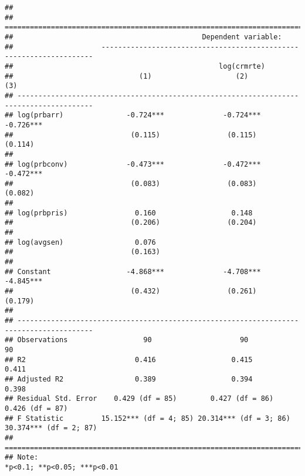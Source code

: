 \documentclass[]{article}
\begin{document}
\begin{verbatim}
## 
## ========================================================================================
##                                             Dependent variable:                         
##                     --------------------------------------------------------------------
##                                                 log(crmrte)                             
##                              (1)                    (2)                    (3)          
## ----------------------------------------------------------------------------------------
## log(prbarr)               -0.724***              -0.724***              -0.726***       
##                            (0.115)                (0.115)                (0.114)        
##                                                                                         
## log(prbconv)              -0.473***              -0.472***              -0.472***       
##                            (0.083)                (0.083)                (0.082)        
##                                                                                         
## log(prbpris)                0.160                  0.148                                
##                            (0.206)                (0.204)                               
##                                                                                         
## log(avgsen)                 0.076                                                       
##                            (0.163)                                                      
##                                                                                         
## Constant                  -4.868***              -4.708***              -4.845***       
##                            (0.432)                (0.261)                (0.179)        
##                                                                                         
## ----------------------------------------------------------------------------------------
## Observations                  90                     90                     90          
## R2                          0.416                  0.415                  0.411         
## Adjusted R2                 0.389                  0.394                  0.398         
## Residual Std. Error    0.429 (df = 85)        0.427 (df = 86)        0.426 (df = 87)    
## F Statistic         15.152*** (df = 4; 85) 20.314*** (df = 3; 86) 30.374*** (df = 2; 87)
## ========================================================================================
## Note:                                                        *p<0.1; **p<0.05; ***p<0.01
\end{verbatim}
\end{document}
